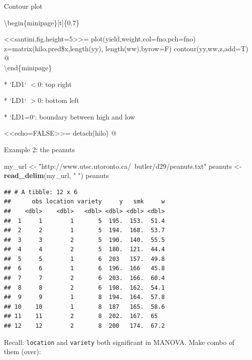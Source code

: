 \documentclass[ignorenonframetext,]{beamer}
\newenvironment{Shaded}{\begin{snugshade}}{\end{snugshade}}
\newcommand{\KeywordTok}[1]{\textcolor[rgb]{0.13,0.29,0.53}{\textbf{#1}}}
\newcommand{\NormalTok}[1]{#1}
\newcommand{\StringTok}[1]{\textcolor[rgb]{0.31,0.60,0.02}{#1}}
\begin{document}
\begin{frame}{Contour plot}
\protect\hypertarget{contour-plot}{}

\textbackslash{}begin\{minipage\}{[}t{]}\{0.7\linewidth\}

\textless{}\textless{}santini,fig.height=5\textgreater{}\textgreater{}=
plot(yield,weight,col=fno,pch=fno) z=matrix(hilo.pred\$x,length(yy),
length(ww),byrow=F) contour(yy,ww,z,add=T) @\\
\textbackslash{}end\{minipage\}

\begin{minipage}[t]{0.25\linewidth}
    
    
* `LD1` $<0$: top right
    
* `LD1` $>0$: bottom left
    
* `LD1=0`: boundary between high and low
    
  \end{minipage}

\textless{}\textless{}echo=FALSE\textgreater{}\textgreater{}=
detach(hilo) @

\end{frame}

\begin{frame}[fragile]{Example 2: the peanuts}
\protect\hypertarget{example-2-the-peanuts}{}

\begin{Shaded}
\begin{Highlighting}[]
\NormalTok{my_url <-}\StringTok{ "http://www.utsc.utoronto.ca/~butler/d29/peanuts.txt"}
\NormalTok{peanuts <-}\StringTok{ }\KeywordTok{read_delim}\NormalTok{(my_url, }\StringTok{" "}\NormalTok{)}
\NormalTok{peanuts}
\end{Highlighting}
\end{Shaded}

\begin{verbatim}
## # A tibble: 12 x 6
##      obs location variety     y   smk     w
##    <dbl>    <dbl>   <dbl> <dbl> <dbl> <dbl>
##  1     1        1       5  195.  153.  51.4
##  2     2        1       5  194.  168.  53.7
##  3     3        2       5  190.  140.  55.5
##  4     4        2       5  180.  121.  44.4
##  5     5        1       6  203   157.  49.8
##  6     6        1       6  196.  166   45.8
##  7     7        2       6  203.  166.  60.4
##  8     8        2       6  198.  162.  54.1
##  9     9        1       8  194.  164.  57.8
## 10    10        1       8  187   165.  58.6
## 11    11        2       8  202.  167.  65  
## 12    12        2       8  200   174.  67.2
\end{verbatim}

Recall: \texttt{location} and \texttt{variety} both significant in
MANOVA. Make combo of them (over):

\end{frame}
\end{document}
